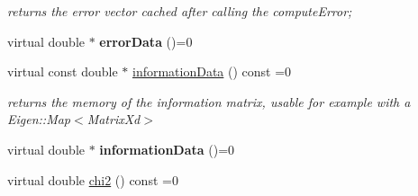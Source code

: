 \begin{DoxyCompactItemize}
\begin{DoxyCompactList}\small\item\em returns the error vector cached after calling the compute\-Error; \end{DoxyCompactList}\item 
\hypertarget{classg2o_1_1OptimizableGraph_1_1Edge_a460a0cb0256b0a91edb131e25181f57b}{virtual double $\ast$ {\bfseries error\-Data} ()=0}\label{classg2o_1_1OptimizableGraph_1_1Edge_a460a0cb0256b0a91edb131e25181f57b}

\item 
\hypertarget{classg2o_1_1OptimizableGraph_1_1Edge_ab5b315b3e0a6c4e29074b2c924460417}{virtual const double $\ast$ \hyperlink{classg2o_1_1OptimizableGraph_1_1Edge_ab5b315b3e0a6c4e29074b2c924460417}{information\-Data} () const =0}\label{classg2o_1_1OptimizableGraph_1_1Edge_ab5b315b3e0a6c4e29074b2c924460417}

\begin{DoxyCompactList}\small\item\em returns the memory of the information matrix, usable for example with a Eigen\-::\-Map$<$\-Matrix\-Xd$>$ \end{DoxyCompactList}\item 
\hypertarget{classg2o_1_1OptimizableGraph_1_1Edge_a99de4bbb57e3c5e7321f150a45d1cb12}{virtual double $\ast$ {\bfseries information\-Data} ()=0}\label{classg2o_1_1OptimizableGraph_1_1Edge_a99de4bbb57e3c5e7321f150a45d1cb12}

\item 
\hypertarget{classg2o_1_1OptimizableGraph_1_1Edge_a182bd2c109d50283c638d9b295f2f3d7}{virtual double \hyperlink{classg2o_1_1OptimizableGraph_1_1Edge_a182bd2c109d50283c638d9b295f2f3d7}{chi2} () const =0}\label{classg2o_1_1OptimizableGraph_1_1Edge_a182bd2c109d50283c638d9b295f2f3d7}


\end{DoxyCompactItemize}
